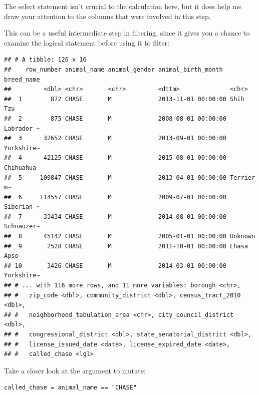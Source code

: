 \documentclass[]{Nemilov}
\newenvironment{Shaded}{\begin{snugshade}}{\end{snugshade}}
\newcommand{\DataTypeTok}[1]{\textcolor[rgb]{0.13,0.29,0.53}{#1}}
\newcommand{\KeywordTok}[1]{\textcolor[rgb]{0.13,0.29,0.53}{\textbf{#1}}}
\newcommand{\NormalTok}[1]{#1}
\newcommand{\OperatorTok}[1]{\textcolor[rgb]{0.81,0.36,0.00}{\textbf{#1}}}
\newcommand{\StringTok}[1]{\textcolor[rgb]{0.31,0.60,0.02}{#1}}
\begin{document}
The select statement isn't crucial to the calculation here, but it does help me draw your attention to the columns that were involved in this step.

This can be a useful intermediate step in filtering, since it gives you a chance to examine the logical statement before using it to filter:

\begin{Shaded}
\end{Shaded}

\begin{verbatim}
## # A tibble: 126 x 16
##    row_number animal_name animal_gender animal_birth_month  breed_name
##         <dbl> <chr>       <chr>         <dttm>              <chr>     
##  1        872 CHASE       M             2013-11-01 00:00:00 Shih Tzu  
##  2        875 CHASE       M             2008-08-01 00:00:00 Labrador ~
##  3      32652 CHASE       M             2013-09-01 00:00:00 Yorkshire~
##  4      42125 CHASE       M             2015-08-01 00:00:00 Chihuahua 
##  5     109847 CHASE       M             2013-04-01 00:00:00 Terrier m~
##  6     114557 CHASE       M             2009-07-01 00:00:00 Siberian ~
##  7      33434 CHASE       M             2014-08-01 00:00:00 Schnauzer~
##  8      45142 CHASE       M             2005-01-01 00:00:00 Unknown   
##  9       2528 CHASE       M             2011-10-01 00:00:00 Lhasa Apso
## 10       3426 CHASE       M             2014-03-01 00:00:00 Yorkshire~
## # ... with 116 more rows, and 11 more variables: borough <chr>,
## #   zip_code <dbl>, community_district <dbl>, census_tract_2010 <dbl>,
## #   neighborhood_tabulation_area <chr>, city_council_district <dbl>,
## #   congressional_district <dbl>, state_senatorial_district <dbl>,
## #   license_issued_date <date>, license_expired_date <date>,
## #   called_chase <lgl>
\end{verbatim}

Take a closer look at the argument to mutate:

\begin{verbatim}
called_chase = animal_name == "CHASE"
\end{verbatim}
\end{document}
